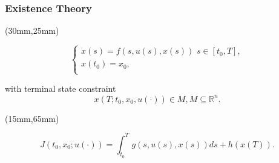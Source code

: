 \begin{frame}[plain]
	\frametitle{Existence Theory}
	\begin{textblock*}{70mm}(30mm,25mm)
		\begin{greenbox}{}
			$$\left\{ \begin{array}{l}
			\dot{x}(s)=f(s,u(s),x(s))\,\,s\in [t_0,T], \\
			x(t_0)=x_0,\\
			\end{array}
			\right.$$
	
			with terminal state constraint
			$$x(T;t_0,x_0,u(\cdot))\in M, M\subseteq \mathbb{R}^n.$$
			
		\end{greenbox}
	\end{textblock*}
	\begin{textblock*}{100mm}(15mm,65mm)
		\begin{yellowbox}{}
			$$J(t_0,x_0;u(\cdot))=\int_{t_0}^{T}g(s,u(s),x(s))ds+h(x(T)).$$
		\end{yellowbox}
	\end{textblock*}
\end{frame}

